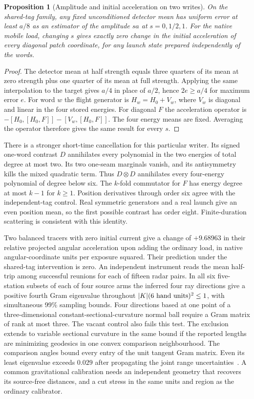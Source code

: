 \documentclass[11pt]{article}
\newtheorem{proposition}[theorem]{Proposition}
\begin{document}
\begin{proposition}[Amplitude and initial acceleration on two writes]
On the shared-tag family, any fixed unconditioned detector mean has
uniform error at least $a/8$ as an estimator of the amplitude $sa$ at
$s=0,1/2,1$. For the native mobile load, changing $s$ gives exactly
zero change in the initial acceleration of every diagonal patch
coordinate, for any launch state prepared independently of the words.
\end{proposition}
\begin{proof}
The detector mean at half strength equals three quarters of its mean at
zero strength plus one quarter of its mean at full strength. Applying
the same interpolation to the target gives $a/4$ in place of $a/2$,
hence $2e\ge a/4$ for maximum error $e$. For word $w$ the flight
generator is $H_w=H_0+V_w$, where $V_w$ is diagonal and linear in
the four stored energies. For diagonal $F$ the acceleration operator is
$-[H_0,[H_0,F]]-[V_w,[H_0,F]]$. The four energy means are fixed.
Averaging the operator therefore gives the same result for every $s$.
\end{proof}
There is a stronger short-time cancellation for this particular writer.
Its signed one-word contrast $D$ annihilates every polynomial in the
two energies of total degree at most two. Its two one-seam marginals
vanish, and its antisymmetry kills the mixed quadratic term. Thus
$D\otimes D$ annihilates every four-energy polynomial of degree below
six. The $k$-fold commutator for $F$ has energy degree at most $k-1$
for $k\ge1$. Position derivatives through order six agree with the
independent-tag control. Real symmetric generators and a real launch
give an even position mean, so the first possible contrast has order
eight. Finite-duration scattering is consistent with this identity.

Two balanced tracers with zero initial current give a change of
$+9.68963$ in their relative projected angular acceleration upon adding
the ordinary load, in native angular-coordinate units per exposure
squared. Their prediction under the shared-tag intervention is zero.
An independent instrument reads the mean half-trip among successful
reunions for each of fifteen radar pairs. In all six five-station
subsets of each of four source arms the inferred four ray directions
give a positive fourth Gram eigenvalue throughout
$|K|(6\ {\rm hand\ units})^2\le1$, with simultaneous 99\% sampling
bounds. Four directions based at one point of a three-dimensional
constant-sectional-curvature normal ball require a Gram matrix of
rank at most three. The vacant control also fails this test.
The exclusion extends to variable sectional curvature in the same
bound if the reported lengths are minimizing geodesics in one convex
comparison neighbourhood. The comparison angles bound every entry of
the unit tangent Gram matrix. Even its least eigenvalue exceeds $0.029$
after propagating the joint range uncertainties~\cite{dyerTriangulations}.
A common gravitational calibration needs an independent geometry that
recovers its source-free distances, and a cut stress in the same units
and region as the ordinary calibrator.
\end{document}

